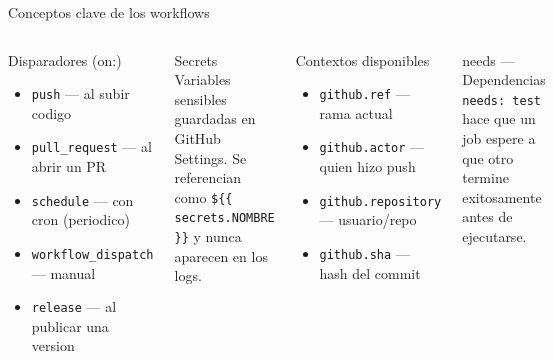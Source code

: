 \documentclass[aspectratio=169]{beamer}
\begin{document}
\begin{frame}{Conceptos clave de los workflows}
  \begin{columns}
    \begin{block}{Disparadores (on:)}
      \begin{itemize}
        \item \texttt{push} --- al subir codigo
        \item \texttt{pull\_request} --- al abrir un PR
        \item \texttt{schedule} --- con cron (periodico)
        \item \texttt{workflow\_dispatch} --- manual
        \item \texttt{release} --- al publicar una version
      \end{itemize}
    \end{block}

    \vspace{0.3cm}

    \begin{block}{Secrets}
      Variables sensibles guardadas en GitHub Settings. Se referencian como \texttt{\$\{\{ secrets.NOMBRE \}\}} y nunca aparecen en los logs.
    \end{block}

    \begin{block}{Contextos disponibles}
      \begin{itemize}
        \item \texttt{github.ref} --- rama actual
        \item \texttt{github.actor} --- quien hizo push
        \item \texttt{github.repository} --- usuario/repo
        \item \texttt{github.sha} --- hash del commit
      \end{itemize}
    \end{block}

    \vspace{0.3cm}

    \begin{block}{needs --- Dependencias}
      \texttt{needs: test} hace que un job espere a que otro termine exitosamente antes de ejecutarse.
    \end{block}
  \end{columns}
\end{frame}

\end{document}
